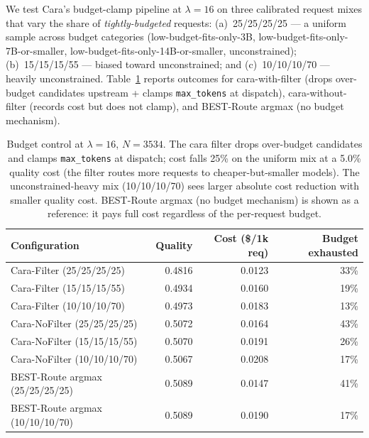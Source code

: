 \documentclass[10pt]{article}
\begin{document}
We test Cara's budget-clamp pipeline at $\lambda{=}16$ on three calibrated request mixes that vary the share of \emph{tightly-budgeted} requests: (a)~25/25/25/25 — a uniform sample across budget categories (low-budget-fits-only-3B, low-budget-fits-only-7B-or-smaller, low-budget-fits-only-14B-or-smaller, unconstrained); (b)~15/15/15/55 — biased toward unconstrained; and (c)~10/10/10/70 — heavily unconstrained. Table~\ref{tab:budget} reports outcomes for cara-with-filter (drops over-budget candidates upstream + clamps \texttt{max\_tokens} at dispatch), cara-without-filter (records cost but does not clamp), and BEST-Route argmax (no budget mechanism).

\begin{table}[t]
\centering
\small
\caption{Budget control at $\lambda=16$, $N=3534$. The cara filter drops over-budget candidates and clamps \texttt{max\_tokens} at dispatch; cost falls 25\% on the uniform mix at a 5.0\% quality cost (the filter routes more requests to cheaper-but-smaller models). The unconstrained-heavy mix (10/10/10/70) sees larger absolute cost reduction with smaller quality cost. BEST-Route argmax (no budget mechanism) is shown as a reference: it pays full cost regardless of the per-request budget.}
\label{tab:budget}
\begin{tabular}{lrrr}
\toprule
Configuration & Quality & Cost (\$/1k req) & Budget exhausted \\
\midrule
Cara-Filter (25/25/25/25)        & 0.4816 & 0.0123 & 33\% \\
Cara-Filter (15/15/15/55)        & 0.4934 & 0.0160 & 19\% \\
Cara-Filter (10/10/10/70)        & 0.4973 & 0.0183 & 13\% \\
Cara-NoFilter (25/25/25/25)      & 0.5072 & 0.0164 & 43\% \\
Cara-NoFilter (15/15/15/55)      & 0.5070 & 0.0191 & 26\% \\
Cara-NoFilter (10/10/10/70)      & 0.5067 & 0.0208 & 17\% \\
BEST-Route argmax (25/25/25/25)  & 0.5089 & 0.0147 & 41\% \\
BEST-Route argmax (10/10/10/70)  & 0.5089 & 0.0190 & 17\% \\
\bottomrule
\end{tabular}
\end{table}
\end{document}
